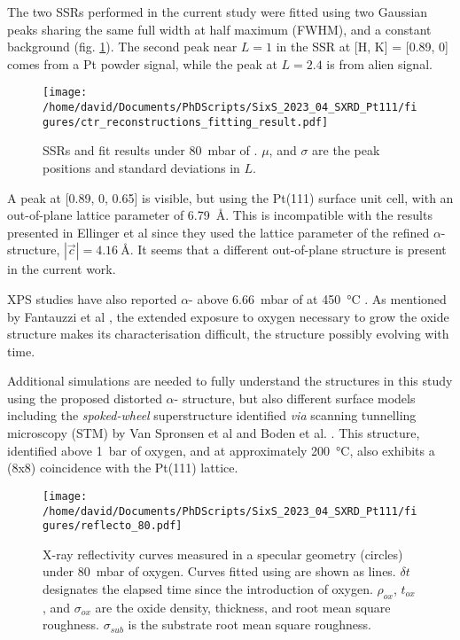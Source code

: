 The two SSRs performed in the current study were fitted using two Gaussian peaks sharing the same full width at half maximum (FWHM), and a constant background (fig. \ref{fig:LScans80Fit}).
The second peak near $L=1$ in the SSR at [H, K] = [0.89, 0] comes from a Pt powder signal, while the peak at $L=2.4$ is from alien signal.

\begin{figure}[!htb]
    \centering
    \texttt{[image: /home/david/Documents/PhDScripts/SixS\_2023\_04\_SXRD\_Pt111/figures/ctr\_reconstructions\_fitting\_result.pdf]}
    \caption{
        SSRs and fit results under \qty{80}{\milli\bar} of .
        $\mu$, and $\sigma$ are the peak positions and standard deviations in $L$.
    }
    \label{fig:LScans80Fit}
\end{figure}

A peak at [0.89, 0, 0.65] is visible, but using the Pt(111) surface unit cell, with an out-of-plane lattice parameter of \qty{6.79}{\angstrom}.
This is incompatible with the results presented in Ellinger et al \parencite*{Ellinger2008} since they used the lattice parameter of the refined $\alpha$- structure, $|\vec{c}|=\qty{4.16}{\angstrom}$.
It seems that a different out-of-plane structure is present in the current work.

XPS studies have also reported $\alpha$- above \qty{6.66}{\milli\bar} of  at \qty{450}{\degreeCelsius} \parencite{Miller2011, Miller2014}.
As mentioned by Fantauzzi et al \parencite*{Fantauzzi2017}, the extended exposure to oxygen necessary to grow the oxide structure makes its characterisation difficult, the structure possibly evolving with time.

Additional simulations are needed to fully understand the structures in this study using the proposed distorted $\alpha$- structure, but also different surface models including the \textit{spoked-wheel} superstructure identified \textit{via} scanning tunnelling microscopy (STM) by Van Spronsen et al \parencite*{VanSpronsen2017} and Boden et al. \parencite*{Boden2022}.
This structure, identified above \qty{1}{\bar} of oxygen, and at approximately \qty{200}{\degreeCelsius}, also exhibits a (8x8) coincidence with the Pt(111) lattice.

\begin{figure}[!htb]
    \centering
    \texttt{[image: /home/david/Documents/PhDScripts/SixS\_2023\_04\_SXRD\_Pt111/figures/reflecto\_80.pdf]}
    \caption{
    	X-ray reflectivity curves measured in a specular geometry (circles) under \qty{80}{\milli\bar} of oxygen.
    	Curves fitted using  are shown as lines.
        $\delta t$ designates the elapsed time since the introduction of oxygen.
        $\rho_{ox}$, $t_{ox}$, and $\sigma_{ox}$ are the oxide density, thickness, and root mean square roughness.
        $\sigma_{sub}$ is the substrate root mean square roughness.
    }
    \label{fig:Reflecto80}
\end{figure}

